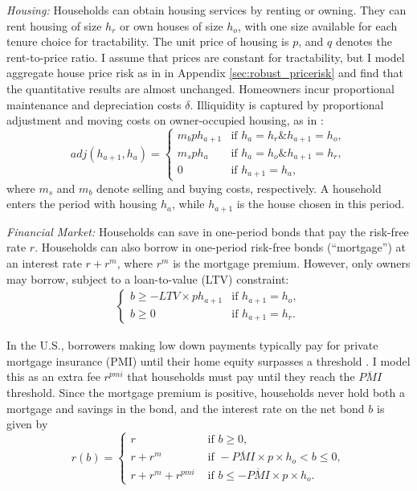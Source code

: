 \documentclass[12pt]{article}
\begin{document}
\textit{Housing:} Households can obtain housing services by renting or owning. They can rent housing of size $h_r$ or own houses of size $h_o$, with one size available for each tenure choice for tractability. The unit price of housing is $p$, and $q$ denotes the rent-to-price ratio. I assume that prices are constant for tractability, but I model aggregate house price risk as in \cite{Corbae2015} in Appendix \ref{sec:robust_pricerisk} and find that the quantitative results are almost unchanged. Homeowners incur proportional maintenance and depreciation costs $\delta$. Illiquidity is captured by proportional adjustment and moving costs on owner-occupied housing, as in \cite{Yang2009}:
\begin{equation}\label{eq:transcost}
adj(h_{a+1},h_a) = \begin{cases}
m_b p h_{a+1} & \text{if } h_{a}=h_r\mathbin{\&} h_{a+1}= h_o, \\
m_s p h_a 	& \text{if } h_a = h_o\mathbin{\&}h_{a+1}=h_r, \\
0 & \text{if } h_{a+1} = h_a,
\end{cases}
\end{equation} where $m_s$ and $m_b$ denote selling and buying costs, respectively. A household enters the period with housing $h_a$, while $h_{a+1}$ is the house chosen in this period. 

\textit{Financial Market:} Households can save in one-period bonds that pay the risk-free rate $r$. Households can also borrow in one-period risk-free bonds (``mortgage'') at an interest rate $r + r^m$, where $r^m$ is the mortgage premium. However, only owners may borrow, subject to a loan-to-value (LTV) constraint:
\begin{align*}
\begin{cases}
b\ge - LTV \times p h_{a+1} & \text{if } h_{a+1} = h_o, \\ 
b\ge 0 & \text{if } h_{a+1} = h_r.
\end{cases}
\end{align*}

In the U.S., borrowers making low down payments typically pay for private mortgage insurance (PMI) until their home equity surpasses a threshold \citep{goodman2017sixty}. I model this as an extra fee $r^{pmi}$ that households must pay until they reach the $\overline{PMI}$ threshold. Since the mortgage premium is positive, households never hold both a mortgage and savings in the bond, and the interest rate on the net bond $b$ is given by
\begin{equation}\label{eq:rb}
r(b) = \begin{cases}
r & \text{ if } b \ge 0, \\
r +r^m & \text{ if } -\overline{PMI}\times p\times h_o < b \le 0, \\
r +r^m +r^{pmi}& \text{ if } b \le -\overline{PMI}\times p\times h_o.
\end{cases}
\end{equation}
\end{document}
